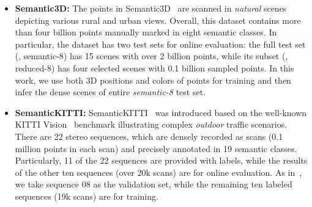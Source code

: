 \documentclass[10pt,twocolumn,letterpaper]{article}
\begin{document}
\begin{itemize}
\begin{table*}
\begin{center}
{\begin{tabular}{c c c c c c c c c c c c c c c c c c c c c}
RandLA-Net~\cite{hu2020randla} &53.9&90.7&73.7&60.3&20.4&86.9&94.2&40.1&26.0&25.8&38.9&81.4&61.3&66.8&49.2&48.2&7.2&56.3&49.2&47.7\\
PolarNet~\cite{zhang2020polarnet} &54.3&90.8&74.4&61.7&21.7&90.0&93.8&22.9&40.3&30.1&28.5&84.0&65.5&67.8&43.2&40.2&5.6&67.8&51.8&57.5\\
MinkNet42~\cite{choy20194d} &54.3 &91.1 &69.7 &63.8 &29.3 &\textbf{92.7} &94.3 &26.1 &23.1 &26.2 &36.7 &83.7 &68.4 &64.7 &43.1 &36.4 &7.9 &57.1 &57.3 &60.1\\
FusionNet~\cite{zhang2020deep} &\textbf{61.3} &\textbf{91.8} &\textbf{77.1} &\textbf{68.8} &\textbf{30.8} &92.5 &95.3 &41.8 &\textbf{47.5} &\textbf{37.7} &34.5 &\textbf{84.5} &\textbf{69.8} &68.5 &\textbf{59.5} &56.8 &11.9 &\textbf{69.4} &\textbf{60.4} &\textbf{66.5}\\
\hline
\textbf{Ours}  &59.9&90.9&74.4&62.2&23.6&89.8&\textbf{95.4}&\textbf{48.7}&31.8&35.5&\textbf{46.7}&82.7&63.4&67.9&49.5&55.7&\textbf{53.0}&60.8&53.7&52.0   \\ \Xhline{3\arrayrulewidth}
\end{tabular}
\label{tab:kitti}
}
\end{center}
\vspace{-3mm}
\end{table*}
 
 \item \textbf{Semantic3D:}  
The points in Semantic3D~\cite{hackel2017semantic3d} are scanned in \emph{natural} scenes depicting various rural and urban views. Overall, this dataset contains more than four billion points manually marked in eight semantic classes. In particular, the dataset has two test sets for online evaluation: the full test set (\ie, semantic-8) has 15 scenes with over 2 billion points, while its subset (\ie, reduced-8) has four selected scenes with 0.1 billion sampled points. In this work, we use both 3D positions and colors of points for training and then infer the dense scenes of entire \emph{semantic-8} test set. 

 \item \textbf{SemanticKITTI:} 
SemanticKITTI~\cite{behley2019semantickitti} was introduced based on the well-known KITTI Vision~\cite{Geiger2012CVPR} benchmark illustrating complex \emph{outdoor} traffic scenarios. There are 22 stereo sequences, which are densely recorded as scans (0.1 million points in each scan) and precisely annotated in 19 semantic classes. Particularly, 11 of the 22 sequences are provided with labels, while the results of the other ten sequences (over 20k scans) are for online evaluation. As in~\cite{behley2019semantickitti}, we take sequence 08 as the validation set, while the remaining ten labeled sequences (19k scans) are for training.
\end{itemize}
\end{document}
